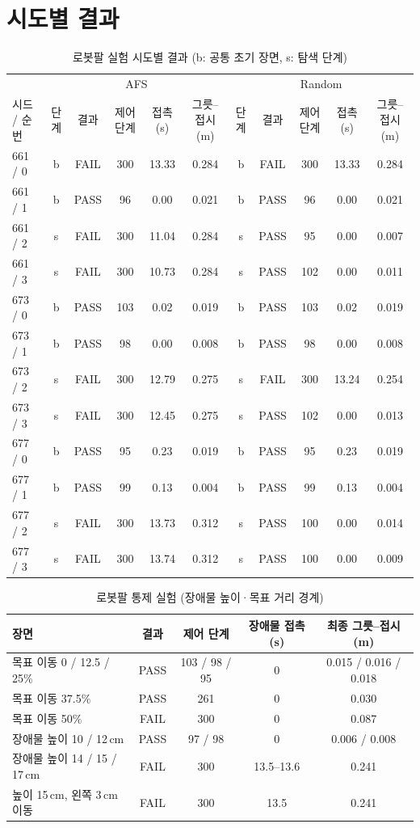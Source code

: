 \section{시도별 결과}
\begin{table}[H]
\centering\scriptsize
\caption{로봇팔 실험 시도별 결과 (b: 공통 초기 장면, s: 탐색 단계)}
\begin{tabular}{@{}lccccc|ccccc@{}}
\toprule
& \multicolumn{5}{c|}{AFS} & \multicolumn{5}{c}{Random} \\
시드 / 순번 & 단계 & 결과 & 제어 단계 & 접촉(s) & 그릇–접시(m) & 단계 & 결과 & 제어 단계 & 접촉(s) & 그릇–접시(m) \\
\midrule
661 / 0 & b & FAIL & 300 & 13.33 & 0.284 & b & FAIL & 300 & 13.33 & 0.284 \\
661 / 1 & b & PASS & 96 & 0.00 & 0.021 & b & PASS & 96 & 0.00 & 0.021 \\
661 / 2 & s & FAIL & 300 & 11.04 & 0.284 & s & PASS & 95 & 0.00 & 0.007 \\
661 / 3 & s & FAIL & 300 & 10.73 & 0.284 & s & PASS & 102 & 0.00 & 0.011 \\
673 / 0 & b & PASS & 103 & 0.02 & 0.019 & b & PASS & 103 & 0.02 & 0.019 \\
673 / 1 & b & PASS & 98 & 0.00 & 0.008 & b & PASS & 98 & 0.00 & 0.008 \\
673 / 2 & s & FAIL & 300 & 12.79 & 0.275 & s & FAIL & 300 & 13.24 & 0.254 \\
673 / 3 & s & FAIL & 300 & 12.45 & 0.275 & s & PASS & 102 & 0.00 & 0.013 \\
677 / 0 & b & PASS & 95 & 0.23 & 0.019 & b & PASS & 95 & 0.23 & 0.019 \\
677 / 1 & b & PASS & 99 & 0.13 & 0.004 & b & PASS & 99 & 0.13 & 0.004 \\
677 / 2 & s & FAIL & 300 & 13.73 & 0.312 & s & PASS & 100 & 0.00 & 0.014 \\
677 / 3 & s & FAIL & 300 & 13.74 & 0.312 & s & PASS & 100 & 0.00 & 0.009 \\
\bottomrule
\end{tabular}
\end{table}

\begin{table}[H]
\centering\small
\caption{로봇팔 통제 실험 (장애물 높이·목표 거리 경계)}
\begin{tabularx}{\linewidth}{@{}Ycccc@{}}
\toprule
장면 & 결과 & 제어 단계 & 장애물 접촉(s) & 최종 그릇–접시(m) \\
\midrule
목표 이동 0 / 12.5 / 25\% & PASS & 103 / 98 / 95 & 0 & 0.015 / 0.016 / 0.018 \\
목표 이동 37.5\% & PASS & 261 & 0 & 0.030 \\
목표 이동 50\% & FAIL & 300 & 0 & 0.087 \\
장애물 높이 10 / 12\,cm & PASS & 97 / 98 & 0 & 0.006 / 0.008 \\
장애물 높이 14 / 15 / 17\,cm & FAIL & 300 & 13.5--13.6 & 0.241 \\
높이 15\,cm, 왼쪽 3\,cm 이동 & FAIL & 300 & 13.5 & 0.241 \\
\bottomrule
\end{tabularx}
\end{table}

